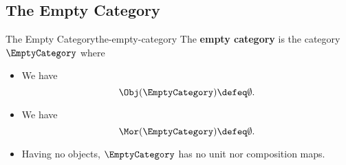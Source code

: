 \subsection{The Empty Category}\label{subsection-the-empty-category}
\begin{example}{The Empty Category}{the-empty-category}%
    The \textbf{empty category} is the category $\EmptyCategory$ where%
    \begin{itemize}
        \item{}We have
            \[
                \Obj(\EmptyCategory)
                \defeq
                \emptyset.
            \]%
        \item{}We have
            \[
                \Mor(\EmptyCategory)
                \defeq
                \emptyset.
            \]%
        \item{}Having no objects, $\EmptyCategory$ has no unit nor composition maps.
    \end{itemize}
\end{example}
